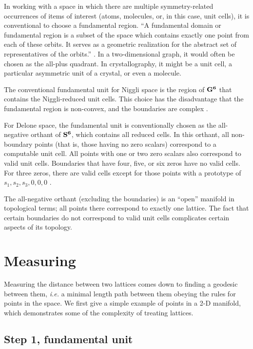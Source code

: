 \documentclass[preprint]{iucr}              %
\numberwithin{equation}{section}
\newcommand{\SVI}[0]{$\bf{S^{6}}$}
\newcommand{\GVI}[0]{$\bf{G^{6}}$}
\begin{document}
	In working with a space in which there are 
	multiple symmetry-related occurrences of items of interest (atoms, molecules, or,
	in this case, unit cells), it is conventional to choose a fundamental
	region. ``A fundamental domain or fundamental region is a subset of the space which contains exactly one point from each of these orbits. It serves as a geometric realization for the abstract set of representatives of the orbits.'' \cite{enwiki:1028832752}. In a two-dimensional graph, it would often be chosen as the all-plus
	quadrant. In crystallography, it might be a unit cell, a
	particular asymmetric unit of a crystal, or even a molecule.
	
	The conventional fundamental unit for Niggli space is the region
	of \GVI{} that contains the Niggli-reduced unit cells. This choice
	has the disadvantage that the fundamental region is non-convex,
	and the boundaries are complex \cite{Andrews2014}.
	
	For Delone space, the fundamental unit is conventionally chosen
	as the all-negative orthant of \SVI{}, which contains all 
	reduced cells. In this orthant, all non-boundary 
	points (that is, those having no zero scalars) correspond to
	a computable unit cell. All points with one or two zero scalars also
	correspond to valid unit cells. Boundaries that have
	four, five, or six zeros have no valid cells. For three zeros, there are
	valid cells except for those points with a prototype of
	$s_1, s_2, s_3, 0, 0, 0$ \cite{Andrews2019b}.
	
	The all-negative orthant (excluding the boundaries) is 
	an ``open'' manifold in topological terms; all points
	there correspond to exactly one lattice. The fact that
	certain boundaries do not correspond to valid unit
	cells complicates certain aspects of its topology.
	
		
	
	\section{Measuring}

	
	Measuring the distance between two lattices
	comes down to finding a geodesic between them, {\it i.e.}
	a minimal length path between them obeying the rules for points
	in the space. We first give a simple example of points in
	a 2-D manifold, which demonstrates some of the complexity of treating lattices.
	
	\subsection{Step 1, fundamental unit}
	\label{fundamental}
	
\end{document}
